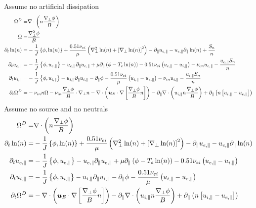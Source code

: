 %
Assume no artificial dissipation
\begin{align*}
\Om^D =& \div\L(n\frac{\grad_\perp\phi}{B}\R)
\\
%
%
%
\Om =& \frac{\grad_\perp^2\phi }{B}
\\
%
%
%
\partial_t \ln(n)
=&
 -\frac{1}{J}\L\{\phi,\ln(n)\R\}
 +\frac{0.51\nu_{ei}}{\mu}
 \L(
   \grad_\perp^2 \ln(n)
   + \L[\grad_\perp \ln(n)\R]^2
\R)
- \partial_\|u_{e,\|}
- u_{e,\|} \partial_\| \ln(n)
 + \frac{S_n}{n}
\\
%
%
%
\partial_t u_{e,\|}
 =&
 -\frac{1}{J}\L\{\phi,u_{e,\|}\R\}
 - u_{e,\|} \partial_\| u_{e,\|}
 + \mu \partial_\| \L(\phi - T_e  \ln(n)\R)
 - 0.51 \nu_{ei} \L(u_{e,\|}-u_{i,\|}\R)
 - \nu_{en} u_{e,\|}
 - \frac{u_{e,\|}S_{n}}{n}
\\
%
%
%
\partial_t u_{i,\|}
 =&
 -\frac{1}{J}\L\{\phi,u_{i,\|}\R\}
 - u_{i,\|} \partial_\| u_{i,\|}
 - \partial_\|\phi
 - \frac{ 0.51 \nu_{ei} }{ \mu } \L(u_{i,\|}-u_{e,\|}\R)
 - \nu_{in} u_{i,\|}
 - \frac{u_{i,\|}S_{n}}{n}
\\
%
%
%
  \partial_t \Om^D
  =&
  - \nu_{in} n\Om - \nu_{in} \frac{\grad_\perp \phi}{B} \cdot \grad_\perp n
  - \div \L( \ve{u}_E\cdot\nabla \L[\frac{\grad_\perp \phi}{B}n \R] \R)
  - \partial_\|\div \L( u_{i,\|}n \frac{\grad_\perp \phi}{B}\R)
 + \partial_\| \L(n\L[ u_{i,\|} - u_{e,\|} \R]\R)
\end{align*}
Assume no source and no neutrals
\begin{align*}
\Om^D =& \div\L(n\frac{\grad_\perp\phi}{B}\R)
\\
%
%
%
\partial_t \ln(n)
=&
 -\frac{1}{J}\L\{\phi,\ln(n)\R\}
 +\frac{0.51\nu_{ei}}{\mu}
 \L(
   \grad_\perp^2 \ln(n)
   + \L[\grad_\perp \ln(n)\R]^2
\R)
- \partial_\|u_{e,\|}
- u_{e,\|} \partial_\| \ln(n)
\\
%
%
%
\partial_t u_{e,\|}
 =&
 -\frac{1}{J}\L\{\phi,u_{e,\|}\R\}
 - u_{e,\|} \partial_\| u_{e,\|}
 + \mu \partial_\| \L(\phi - T_e  \ln(n)\R)
 - 0.51 \nu_{ei} \L(u_{e,\|}-u_{i,\|}\R)
\\
%
%
%
\partial_t u_{i,\|}
 =&
 -\frac{1}{J}\L\{\phi,u_{i,\|}\R\}
 - u_{i,\|} \partial_\| u_{i,\|}
 - \partial_\|\phi
 - \frac{ 0.51 \nu_{ei} }{ \mu } \L(u_{i,\|}-u_{e,\|}\R)
\\
%
%
%
  \partial_t \Om^D
  =&
  - \div \L( \ve{u}_E\cdot\nabla \L[\frac{\grad_\perp \phi}{B}n \R] \R)
  - \partial_\|\div \L( u_{i,\|}n \frac{\grad_\perp \phi}{B}\R)
 + \partial_\| \L(n\L[ u_{i,\|} - u_{e,\|} \R]\R)
\end{align*}
